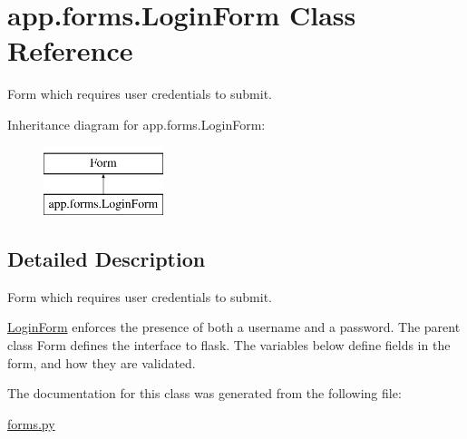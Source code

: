 \hypertarget{classapp_1_1forms_1_1LoginForm}{}\section{app.\+forms.\+Login\+Form Class Reference}
\label{classapp_1_1forms_1_1LoginForm}


Form which requires user credentials to submit.  


Inheritance diagram for app.\+forms.\+Login\+Form\+:\begin{figure}[H]
\begin{center}
\leavevmode
\includegraphics[height=2.000000cm]{classapp_1_1forms_1_1LoginForm}
\end{center}
\end{figure}


\subsection{Detailed Description}
Form which requires user credentials to submit. 

\hyperlink{classapp_1_1forms_1_1LoginForm}{Login\+Form} enforces the presence of both a username and a password. The parent class Form defines the interface to flask. The variables below define fields in the form, and how they are validated. 

The documentation for this class was generated from the following file\+:\begin{DoxyCompactItemize}
\item 
\hyperlink{forms_8py}{forms.\+py}\end{DoxyCompactItemize}
